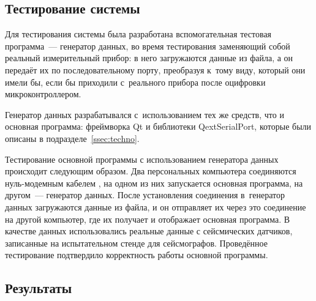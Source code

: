 \documentclass[a4paper, 14pt]{extarticle}
\newenvironment{myfigure}[2]%
    {\pushQED{\caption{#1} \label{#2}} %
     \begin{figure}[!htb]\centering } %
    {  \popQED %
     \end{figure}}
\newcommand{\includefigure}[3][]{
    \begin{myfigure}{#2}{fig:#3}
      \texttt{[image: \#3]}
    \end{myfigure}
  }
\begin{document}
  \subsection{Тестирование системы}\label{ssec:testing}

  Для тестирования системы была разработана вспомогательная тестовая программа~--- генератор данных,
  во время тестирования заменяющий собой реальный измерительный прибор: в него загружаются данные из
  файла, а он передаёт их по последовательному порту, преобразуя к~тому виду, который они имели бы,
  если бы приходили с~реального прибора после оцифровки микроконтроллером.

  Генератор данных разрабатывался с~использованием тех же средств, что и основная программа:
  фреймворка Qt и библиотеки QextSerialPort, которые были описаны в подразделе~\ref{ssec:techno}.



  Тестирование основной программы с использованием генератора данных происходит следующим образом.
  Два персональных компьютера
  соединяются нуль-модемным кабелем \cite{null-modem}, на одном из них запускается основная
  программа, на другом~--- генератор данных. После установления соединения в~генератор данных
  загружаются данные из файла, и он отправляет их через это соединение на другой компьютер, где их
  получает и отображает основная программа. В качестве данных использовались реальные данные с
  сейсмических датчиков, записанные на испытательном стенде для сейсмографов. Проведённое
  тестирование подтвердило корректность работы основной программы.

  \subsection{Результаты}
\end{document}
